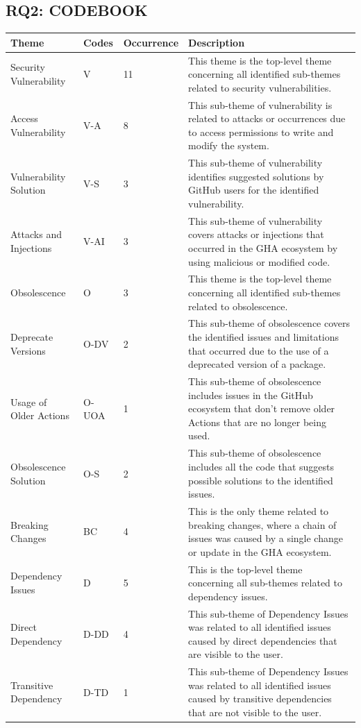 \documentclass[conference]{IEEEtran}
\begin{document}
\subsection{RQ2: CODEBOOK}
\begin{table}[h]
    \centering
    \label{tab:full-width}
    \hspace{0.5cm}
    \begin{tabular}{|p{3cm}|p{1cm}|p{1.5cm}|p{11cm}|}
        \hline
        \textbf{Theme} & \textbf{Codes}  & \textbf{Occurrence}  & \textbf{Description} \\
        \hline
        Security Vulnerability & V & 11 & This theme is the top-level theme concerning all identified sub-themes related to security vulnerabilities. \\
        \hline
        Access Vulnerability & V-A & 8 & This sub-theme of vulnerability is related to attacks or occurrences due to access permissions to write and modify the system. \\
        \hline
        Vulnerability Solution & V-S & 3 & This sub-theme of vulnerability identifies suggested solutions by GitHub users for the identified vulnerability.\\
        \hline
        Attacks and Injections & V-AI & 3 & This sub-theme of vulnerability covers attacks or injections that occurred in the GHA ecosystem by using malicious or modified code. \\
        \hline
        Obsolescence & O & 3 & This theme is the top-level theme concerning all identified sub-themes related to obsolescence.\\
        \hline
        Deprecate Versions & O-DV & 2 & This sub-theme of obsolescence covers the identified issues and limitations that occurred due to the use of a deprecated version of a package. \\
        \hline
        Usage of Older Actions & O-UOA & 1& This sub-theme of obsolescence includes issues in the GitHub ecosystem that don't remove older Actions that are no longer being used. \\
        \hline
        Obsolescence Solution & O-S & 2 & This sub-theme of obsolescence includes all the code that suggests possible solutions to the identified issues. \\
        \hline
        Breaking Changes & BC & 4 & This is the only theme related to breaking changes, where a chain of issues was caused by a single change or update in the GHA ecosystem. \\
        \hline
        Dependency Issues & D & 5 & This is the top-level theme concerning all sub-themes related to dependency issues. \\	
        \hline
        Direct Dependency  & D-DD & 4 & This sub-theme of Dependency Issues was related to all identified issues caused by direct dependencies that are visible to the user. \\	
        \hline
        Transitive Dependency & D-TD & 1 & This sub-theme of Dependency Issues was related to all identified issues caused by transitive dependencies that are not visible to the user.\\	
        \hline
    \end{tabular}
\end{table}	
\end{document}
